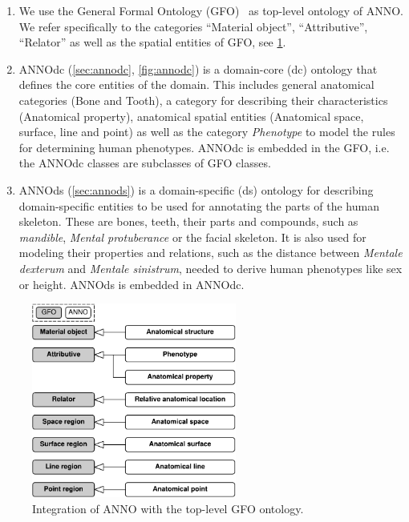 \documentclass[sw]{iosart2x}
\begin{document}
\begin{enumerate}
\item We use the General Formal Ontology (GFO)~\citep{gfo} as top-level ontology of ANNO.
We refer specifically to the categories \enquote{Material object}, \enquote{Attributive}, \enquote{Relator} as well as the spatial entities of GFO, see \cref{fig:gfo}. %

\item ANNOdc (\cref{sec:annodc}, \cref{fig:annodc}) is a domain-core (dc) ontology that defines the core entities of the domain.
This includes general anatomical categories (Bone and Tooth), a category for describing their characteristics (Anatomical property), anatomical spatial entities (Anatomical space, surface, line and point) as well as the category \emph{Phenotype} to model the rules for determining human phenotypes.
ANNOdc is embedded in the GFO, i.e. the ANNOdc classes are subclasses of GFO classes.

\item ANNOds (\cref{sec:annods}) is a domain-specific (ds) ontology for describing domain-specific entities to be used for annotating the parts of the human skeleton.
These are bones, teeth, their parts and compounds, such as \emph{mandible}, \emph{Mental protuberance} or the facial skeleton.
It is also used for modeling their properties and relations, such as the distance between \emph{Mentale dexterum} and \emph{Mentale sinistrum}, needed to derive human phenotypes like sex or height.
ANNOds is embedded in ANNOdc.
\end{enumerate}

\begin{figure}[h]
\includegraphics[width=0.6\textwidth]{img/gfo.pdf}
\caption{Integration of ANNO with the top-level GFO ontology.}\label{fig:gfo}
\end{figure}
\end{document}
